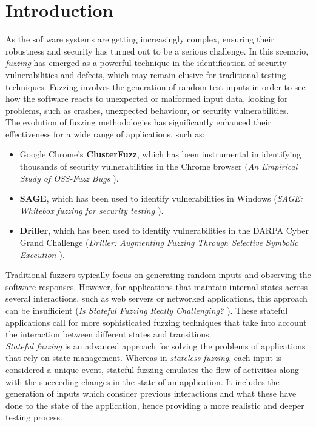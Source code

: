 \chapter{Introduction}

As the software systems are getting increasingly complex, ensuring their robustness and security has turned out to be a serious challenge. In this scenario, \textit{fuzzing} has emerged as a powerful technique in the identification of security vulnerabilities and defects, which may remain elusive for traditional testing techniques. Fuzzing involves the generation of random test inputs in order to see how the software reacts to unexpected or malformed input data, looking for problems, such as crashes, unexpected behaviour, or security vulnerabilities.
\\The evolution of fuzzing methodologies has significantly enhanced their effectiveness for a wide range of applications, such as:
\begin{itemize}
    \item Google Chrome's \textbf{ClusterFuzz}, which has been instrumental in identifying thousands of security vulnerabilities in the Chrome browser (\textit{An Empirical Study of OSS-Fuzz Bugs \cite{ossfuzz}}).
    \item \textbf{SAGE}, which has been used to identify vulnerabilities in Windows (\textit{SAGE: Whitebox fuzzing for security testing \cite{sage}}).
    \item \textbf{Driller}, which has been used to identify vulnerabilities in the DARPA Cyber Grand Challenge (\textit{Driller: Augmenting Fuzzing Through Selective Symbolic Execution \cite{driller}}).
\end{itemize}
Traditional fuzzers typically focus on generating random inputs and observing the software responses. However, for applications that maintain internal states across several interactions, such as web servers or networked applications, this approach can be insufficient (\textit{Is Stateful Fuzzing Really Challenging? \cite{statefulfuzzingchallenges}}). These stateful applications call for more sophisticated fuzzing techniques that take into account the interaction between different states and transitions.
\\\textit{Stateful fuzzing} is an advanced approach for solving the problems of applications that rely on state management. Whereas in \textit{stateless fuzzing}, each input is considered a unique event, stateful fuzzing emulates the flow of activities along with the succeeding changes in the state of an application. It includes the generation of inputs which consider previous interactions and what these have done to the state of the application, hence providing a more realistic and deeper testing process.
